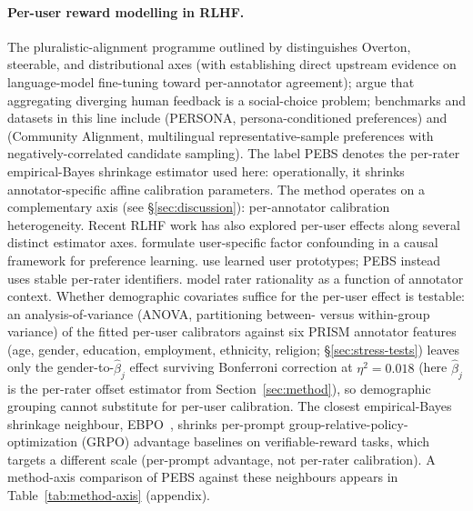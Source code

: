 \documentclass{article}
\newcommand{\PEBS}{\textsc{PEBS}}
\begin{document}
\paragraph{Per-user reward modelling in RLHF.}
The pluralistic-alignment programme outlined by
\citet{sorensen2024roadmap} distinguishes Overton, steerable,
and distributional axes (with \citet{bakker2022fineagree}
establishing direct upstream evidence on language-model
fine-tuning toward per-annotator agreement);
\citet{conitzer2024socialchoice} argue that
aggregating diverging human feedback is a social-choice problem;
benchmarks and datasets in this line include
\citet{castricato2025persona} (PERSONA, persona-conditioned
preferences) and \citet{zhang2025community} (Community Alignment,
multilingual representative-sample preferences with
negatively-correlated candidate sampling). The label \PEBS{} denotes
the per-rater empirical-Bayes shrinkage estimator used here:
operationally, it shrinks annotator-specific affine calibration
parameters. The method
operates on a complementary axis (see \S\ref{sec:discussion}):
per-annotator calibration heterogeneity. Recent RLHF work has also explored
per-user effects along several distinct estimator axes.
\citet{kobalczyk2025preference} formulate
user-specific factor confounding in a causal framework for preference
learning.
\citet{pgenrm2026} use learned user prototypes; PEBS instead uses
stable per-rater identifiers. \citet{liu2025uq} model rater
rationality as a function of annotator context. Whether demographic
covariates suffice for the per-user effect is testable: an
analysis-of-variance (ANOVA, partitioning between- versus
within-group variance) of the fitted per-user calibrators against
six PRISM annotator features (age, gender, education, employment,
ethnicity, religion; \S\ref{sec:stress-tests}) leaves only the
gender-to-$\hat\beta_j$ effect surviving Bonferroni correction at
$\eta^2{=}0.018$ (here $\hat\beta_j$ is the per-rater offset
estimator from Section~\ref{sec:method}), so demographic grouping cannot substitute for
per-user calibration. The closest empirical-Bayes
shrinkage neighbour, \textsc{EBPO}~\citep{han2026ebpo}, shrinks
per-prompt group-relative-policy-optimization (GRPO) advantage
baselines on verifiable-reward tasks,
which targets a different scale (per-prompt advantage, not
per-rater calibration). A method-axis comparison of PEBS against
these neighbours appears in Table~\ref{tab:method-axis}
(appendix).
\end{document}
